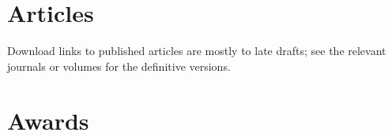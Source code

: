 \documentclass[%
  11pt,%
]{article}
\begin{document}
\section{Articles}

\newrefsection
\nocite{*}


Download links to published articles are mostly to late drafts; see the relevant journals or volumes for the definitive versions.

\printbibliography[filter=myarticle]





\section{Awards}
\end{document}
